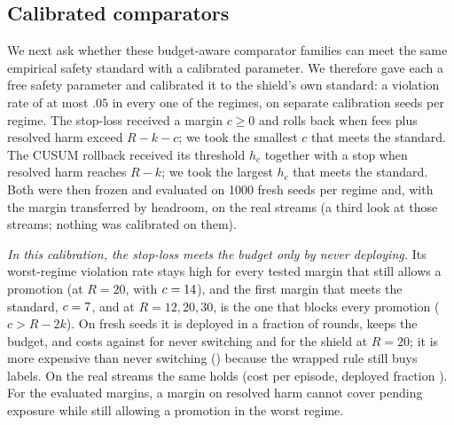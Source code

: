 \documentclass[10pt]{article}
\theoremstyle{plain}
\theoremstyle{definition}
\begin{document}


\begin{table}[t]
\caption{Exceedance rate of $R=20$ pooled (mean of per-regime rates) over the six stress regimes and the 24 original regimes.}\label{tab:split}
\centering\small

\end{table}

\begin{table}[t]
\caption{Ablations at $R=12$ (registered C6): worst-regime violation rate with the Wilson 95\% interval.}\label{tab:ablation}
\centering\small

\end{table}

\subsection{Calibrated comparators}\label{sec:calib}
We next ask whether these budget-aware comparator families can meet the same empirical safety standard with a calibrated parameter. We therefore gave each a free safety parameter and calibrated it to the shield's own standard: a violation rate of at most $.05$ in every one of the \NRegimes{} regimes, on \CalNSeeds{} separate calibration seeds per regime. The stop-loss received a margin $c\ge0$ and rolls back when fees plus resolved harm exceed $R-k-c$; we took the smallest $c$ that meets the standard. The CUSUM rollback received its threshold $h_c$ together with a stop when resolved harm reaches $R-k$; we took the largest $h_c$ that meets the standard. Both were then frozen and evaluated on 1000 fresh seeds per regime and, with the margin transferred by headroom, on the real streams (a third look at those streams; nothing was calibrated on them).

\emph{In this calibration, the stop-loss meets the budget only by never deploying.} Its worst-regime violation rate stays high for every tested margin that still allows a promotion (at $R=20$, \CalStopLastViol{} with $c=14$), and the first margin that meets the standard, $c=7$, \CalStopCB{} and \CalStopCC{} at $R=12,20,30$, is the one that blocks every promotion ($c>R-2k$). On fresh seeds it is deployed in a fraction \CalStopDepB{} of rounds, keeps the budget, and costs \CalStopJB{} against \CalNeverJ{} for never switching and \CalShieldJB{} for the shield at $R=20$; it is more expensive than never switching (\CalStopDNever) because the wrapped rule still buys labels. On the real streams the same holds (cost \RCalStopJ{} per episode, deployed fraction \RCalStopDep{}). For the evaluated margins, a margin on resolved harm cannot cover pending exposure while still allowing a promotion in the worst regime.
\end{document}
